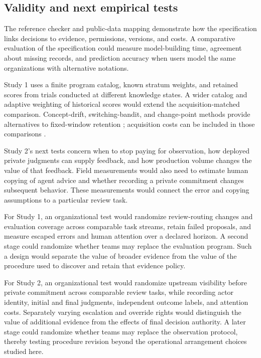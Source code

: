 \subsection{Validity and next empirical tests}
\label{sec:validity}

The reference checker and public-data mapping demonstrate how the specification links decisions to evidence, permissions, versions, and costs. A comparative evaluation of the specification could measure model-building time, agreement about missing records, and prediction accuracy when users model the same organizations with alternative notations.

Study 1 uses a finite program catalog, known stratum weights, and retained scores from trials conducted at different knowledge states. A wider catalog and adaptive weighting of historical scores would extend the acquisition-matched comparison. Concept-drift, switching-bandit, and change-point methods provide alternatives to fixed-window retention \citep{drift,switchbandit,bocpd}; acquisition costs can be included in those comparisons \citep{costbandit}.

Study 2's next tests concern when to stop paying for observation, how deployed private judgments can supply feedback, and how production volume changes the value of that feedback. Field measurements would also need to estimate human copying of agent advice and whether recording a private commitment changes subsequent behavior. These measurements would connect the error and copying assumptions to a particular review task.

For Study 1, an organizational test would randomize review-routing changes and evaluation coverage across comparable task streams, retain failed proposals, and measure escaped errors and human attention over a declared horizon. A second stage could randomize whether teams may replace the evaluation program. Such a design would separate the value of broader evidence from the value of the procedure used to discover and retain that evidence policy.

For Study 2, an organizational test would randomize upstream visibility before private commitment across comparable review tasks, while recording actor identity, initial and final judgments, independent outcome labels, and attention costs. Separately varying escalation and override rights would distinguish the value of additional evidence from the effects of final decision authority. A later stage could randomize whether teams may replace the observation protocol, thereby testing procedure revision beyond the operational arrangement choices studied here.

